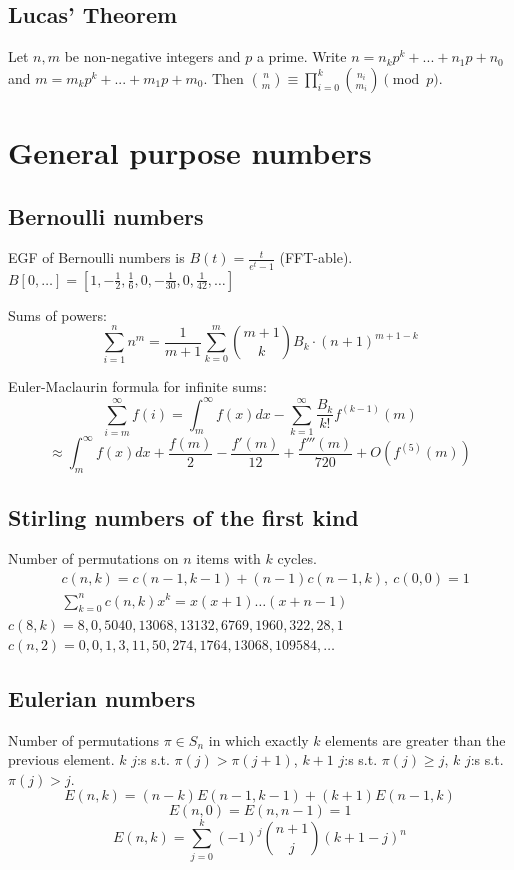 	\subsection{Lucas' Theorem}
		Let $n,m$ be non-negative integers and $p$ a prime. Write $n=n_kp^k+...+n_1p+n_0$ and $m=m_kp^k+...+m_1p+m_0$. Then $\binom{n}{m} \equiv \prod_{i=0}^k\binom{n_i}{m_i} \pmod{p}$.

\section{General purpose numbers}
	\subsection{Bernoulli numbers}
		EGF of Bernoulli numbers is $B(t)=\frac{t}{e^t-1}$ (FFT-able).
		$B[0,\ldots] = [1, -\frac{1}{2}, \frac{1}{6}, 0, -\frac{1}{30}, 0, \frac{1}{42}, \ldots]$

		Sums of powers:
		\small
		\[ \sum_{i=1}^n n^m = \frac{1}{m+1} \sum_{k=0}^m \binom{m+1}{k} B_k \cdot (n+1)^{m+1-k} \]
		\normalsize

		Euler-Maclaurin formula for infinite sums:
		\small
		\[ \sum_{i=m}^{\infty} f(i) = \int_m^\infty f(x) dx - \sum_{k=1}^\infty \frac{B_k}{k!}f^{(k-1)}(m) \]
		\[ \approx \int_{m}^\infty f(x)dx + \frac{f(m)}{2} - \frac{f'(m)}{12} + \frac{f'''(m)}{720} + O(f^{(5)}(m)) \]
		\normalsize

	\subsection{Stirling numbers of the first kind}
		Number of permutations on $n$ items with $k$ cycles.
		\begin{align*}
			&c(n,k) = c(n-1,k-1) + (n-1) c(n-1,k),\ c(0,0) = 1 \\
			&\textstyle \sum_{k=0}^n c(n,k)x^k = x(x+1) \dots (x+n-1)
		\end{align*}
		$c(8,k) = 8, 0, 5040, 13068, 13132, 6769, 1960, 322, 28, 1$ \\
		$c(n,2) = 0, 0, 1, 3, 11, 50, 274, 1764, 13068, 109584, \dots$

	\subsection{Eulerian numbers}
		Number of permutations $\pi \in S_n$ in which exactly $k$ elements are greater than the previous element. $k$ $j$:s s.t. $\pi(j)>\pi(j+1)$, $k+1$ $j$:s s.t. $\pi(j)\geq j$, $k$ $j$:s s.t. $\pi(j)>j$.
		$$E(n,k) = (n-k)E(n-1,k-1) + (k+1)E(n-1,k)$$
		$$E(n,0) = E(n,n-1) = 1$$
		$$E(n,k) = \sum_{j=0}^k(-1)^j\binom{n+1}{j}(k+1-j)^n$$

